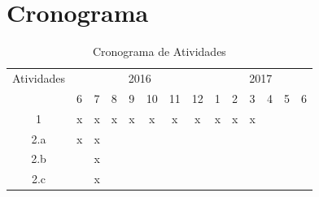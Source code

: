 \section{Cronograma}
\label{chapter:cronograma}
\begin{table}[ht!]
\centering
\caption{Cronograma de Atividades}
\label{my-label}
\begin{tabular}{|c|l|l|l|l|l|l|l|l|l|l|l|l|l|}
\hline
\multicolumn{1}{|l|}{Atividades} & \multicolumn{7}{c|}{2016}                                                                                                                                                    & \multicolumn{6}{c|}{2017}                                                            \\ \cline{2-14} 
\multicolumn{1}{|l|}{}                            & 6                      & 7                      & 8                      & 9                      & 10                     & 11                     & 12                     & 1                      & 2                      & 3                      & 4 & 5 & 6 \\ \hline
1                                                 & \multicolumn{1}{c|}{x} & \multicolumn{1}{c|}{x} & \multicolumn{1}{c|}{x} & \multicolumn{1}{c|}{x} & \multicolumn{1}{c|}{x} & \multicolumn{1}{c|}{x} & \multicolumn{1}{c|}{x} & \multicolumn{1}{c|}{x} & \multicolumn{1}{c|}{x} & \multicolumn{1}{c|}{x} &   &   &   \\ \hline
2.a                                               & x                      & x                      &                        &                        &                        &                        &                        &                        &                        &                        &   &   &   \\ \hline
2.b                                               &                        & x                      &                        &                        &                        &                        &                        &                        &                        &                        &   &   &   \\ \hline
2.c                                               &                        & x                      &                        &                        &                        &                        &                        &                        &                        &                        &   &   &   \\ \hline

\end{tabular}
\end{table}
